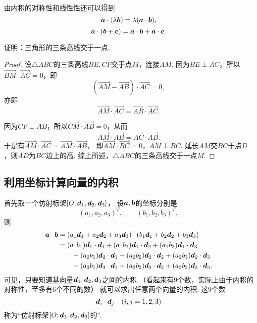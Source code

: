 由内积的对称性和线性性还可以得到\[
	\boldsymbol{a}\cdot(\lambda\boldsymbol{b})=\lambda(\boldsymbol{a}\cdot\boldsymbol{b}),
\]\[
	\boldsymbol{a}\cdot(\boldsymbol{b}+\boldsymbol{c})=\boldsymbol{a}\cdot\boldsymbol{b}+\boldsymbol{a}\cdot\boldsymbol{c}.
\]

\begin{example}
证明：三角形的三条高线交于一点.
\begin{proof}
设\(\triangle ABC\)的三条高线\(BE,CF\)交于点\(M\)，连接\(AM\).
因为\(BE \perp AC\)，所以\(\vec{BM}\cdot\vec{AC}=0\)，即\[
	(\vec{AM}-\vec{AB})\cdot\vec{AC}=0,
\]
亦即\[
	\vec{AM}\cdot\vec{AC}=\vec{AB}\cdot\vec{AC}.
\]

因为\(CF \perp AB\)，所以\(\vec{CM}\cdot\vec{AB}=0\)，从而\[
	\vec{AM}\cdot\vec{AB}=\vec{AC}\cdot\vec{AB}.
\]
于是有\(\vec{AM}\cdot\vec{AC}=\vec{AM}\cdot\vec{AB}\)，
即\(\vec{AM}\cdot\vec{BC}=0\)，\(AM \perp BC\).
延长\(AM\)交\(BC\)于点\(D\)，则\(AD\)为\(BC\)边上的高.
综上所述，\(\triangle ABC\)的三条高线交于一点\(M\).
\end{proof}
\end{example}

\subsection{利用坐标计算向量的内积}
首先取一个仿射标架\([O;\boldsymbol{d}_1,\boldsymbol{d}_2,\boldsymbol{d}_3]\)，
设\(\boldsymbol{a},\boldsymbol{b}\)的坐标分别是\[
	(a_1,a_2,a_3)^T, \qquad
	(b_1,b_2,b_3)^T,
\]
则\begin{equation}
	\begin{split}
	\boldsymbol{a}\cdot\boldsymbol{b}
	&= (a_1 \boldsymbol{d}_1 + a_2 \boldsymbol{d}_2 + a_3 \boldsymbol{d}_3)
	\cdot (b_1 \boldsymbol{d}_1 + b_2 \boldsymbol{d}_2 + b_3 \boldsymbol{d}_3) \\
	&= (a_1 b_1) \boldsymbol{d}_1 \cdot \boldsymbol{d}_1
	+ (a_1 b_2) \boldsymbol{d}_1 \cdot \boldsymbol{d}_2
	+ (a_1 b_3) \boldsymbol{d}_1 \cdot \boldsymbol{d}_3 \\
	&\hspace{20pt}
	+ (a_2 b_1) \boldsymbol{d}_2 \cdot \boldsymbol{d}_1
	+ (a_2 b_2) \boldsymbol{d}_2 \cdot \boldsymbol{d}_2
	+ (a_2 b_3) \boldsymbol{d}_2 \cdot \boldsymbol{d}_3 \\
	&\hspace{20pt}
	+ (a_3 b_1) \boldsymbol{d}_3 \cdot \boldsymbol{d}_1
	+ (a_3 b_2) \boldsymbol{d}_3 \cdot \boldsymbol{d}_2
	+ (a_3 b_3) \boldsymbol{d}_3 \cdot \boldsymbol{d}_3.
	\end{split}
\end{equation}
可见，只要知道基向量\(\boldsymbol{d}_1,\boldsymbol{d}_2,\boldsymbol{d}_3\)之间的内积
（看起来有9个数，实际上由于内积的对称性，至多有6个不同的数）
就可以求出任意两个向量的内积.
这9个数\[
	\boldsymbol{d}_i \cdot \boldsymbol{d}_j
	\quad(i,j=1,2,3)
\]称为“仿射标架\([O;\boldsymbol{d}_1,\boldsymbol{d}_2,\boldsymbol{d}_3]\)的”.

